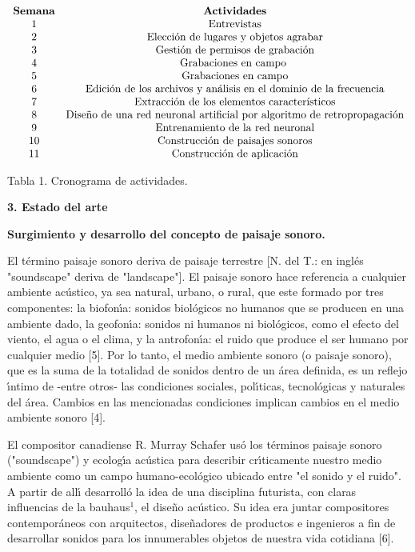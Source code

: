 $%
\begin{array}
[c]{cc}%
\text{\textbf{Semana}} & \text{\textbf{Actividades}}\\
\text{1} & \text{Entrevistas}\\
\text{2} & \text{Elecci\'{o}n de lugares y objetos agrabar}\\
\text{3} & \text{Gesti\'{o}n de permisos de grabaci\'{o}n}\\
\text{4} & \text{Grabaciones en campo }\\
\text{5} & \text{Grabaciones en campo}\\
\text{6} & \text{Edici\'{o}n de los archivos y an\'{a}lisis en el dominio de
la frecuencia}\\
\text{7} & \text{Extracci\'{o}n de los elementos caracter\'{\i}sticos}\\
\text{8} & \text{Dise\~{n}o de una red neuronal artificial por algoritmo de
retropropagaci\'{o}n}\\
\text{9} & \text{Entrenamiento de la red neuronal}\\
\text{10} & \text{Construcci\'{o}n de paisajes sonoros}\\
\text{11} & \text{Construcci\'{o}n de aplicaci\'{o}n}%
\end{array}
$

Tabla 1. Cronograma de actividades.

\textbf{3. Estado del arte}

\textbf{ Surgimiento y desarrollo del concepto de paisaje sonoro.}

El t\'{e}rmino paisaje sonoro deriva de paisaje terrestre [N. del T.: en
ingl\'{e}s "soundscape" deriva de "landscape"]. El paisaje sonoro hace
referencia a cualquier ambiente ac\'{u}stico, ya sea natural, urbano, o rural,
que este formado por tres componentes: la biofon\'{\i}a: sonidos
biol\'{o}gicos no humanos que se producen en una ambiente dado, la
geofon\'{\i}a: sonidos ni humanos ni biol\'{o}gicos, como el efecto del
viento, el agua o el clima, y la antrofon\'{\i}a: el ruido que produce el ser
humano por cualquier medio [5]. Por lo tanto, el medio ambiente sonoro (o
paisaje sonoro), que es la suma de la totalidad de sonidos dentro de un
\'{a}rea definida, es un reflejo \'{\i}ntimo de -entre otros- las condiciones
sociales, pol\'{\i}ticas, tecnol\'{o}gicas y naturales del \'{a}rea. Cambios
en las mencionadas condiciones implican cambios en el medio ambiente sonoro [4].

El compositor canadiense R. Murray Schafer us\'{o} los t\'{e}rminos paisaje
sonoro ("soundscape") y ecolog\'{\i}a ac\'{u}stica para describir
cr\'{\i}ticamente nuestro medio ambiente como un campo humano-ecol\'{o}gico
ubicado entre "el sonido y el ruido". A partir de all\'{\i} desarroll\'{o} la
idea de una disciplina futurista, con claras influencias de la bauhaus$^{1}$,
el dise\~{n}o ac\'{u}stico. Su idea era juntar compositores contempor\'{a}neos
con arquitectos, dise\~{n}adores de productos e ingenieros a fin de
desarrollar sonidos para los innumerables objetos de nuestra vida cotidiana [6].

